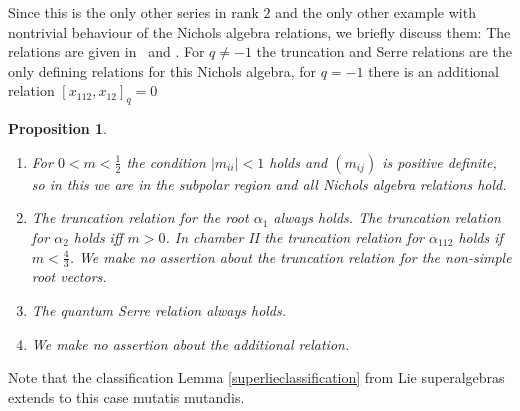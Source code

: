 \documentclass[pdftex]{sigma}%
\numberwithin{equation}{section}
\newtheorem{prop}[teo]{Proposition}
\begin{document}
Since this is the only other series in rank $2$ and the only other example with nontrivial behaviour of the Nichols algebra relations, we briefly discuss them: The relations are given in~\cite{Helb10} and \cite[Section~7.2]{AA17}. For $q\neq -1$ the truncation and Serre relations are the only defining relations for this Nichols algebra, for $q=-1$ there is an additional relation $[x_{112},x_{12}]_q=0$
\begin{prop}\label{prop_colorLieNA}\quad
		\begin{enumerate}\itemsep=0pt
	\item[$1.$] For $0<m<\frac{1}{2}$ the condition $|m_{ii}|<1$ holds and $(m_{ij})$ is positive definite, so in this we are in the subpolar region and all Nichols algebra relations hold.
	\item[$2.$] The truncation relation for the root $\alpha_1$ always holds. The truncation relation for $\alpha_2$ holds iff $m>0$. In chamber II the truncation relation for $\alpha_{112}$ holds if $m<\frac{4}{3}$. We make no assertion about the truncation relation for the non-simple root vectors.
	\item[$3.$] The quantum Serre relation always holds.
	\item[$4.$] We make no assertion about the additional relation.
\end{enumerate}
\end{prop}

Note that the classification Lemma \ref{superlieclassification} from Lie superalgebras extends to this case mutatis mutandis.
\end{document}
